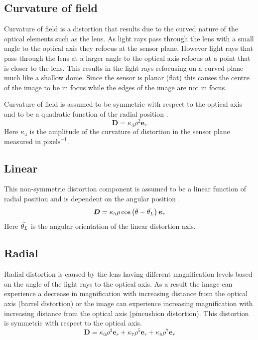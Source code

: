 \subsection{Curvature of field}
Curvature of field is a distortion that results due to the curved nature of the optical elements such as the lens. As light rays pass through the lens with a small angle to the optical axis they refocus at the sensor plane. However light rays that pass through the lens at a larger angle to the optical axis refocus at a point that is closer to the lens. This results in the light rays refocusing on a curved plane much like a shallow dome. Since the sensor is planar (flat) this causes the centre of the image to be in focus while the edges of the image are not in focus.

Curvature of field is assumed to be symmetric with respect to the optical axis and to be a quadratic function of the radial position \cite{sutton2009image}.
\begin{equation}
	\bm{D}=\kappa_4 \rho^2 \bm{e}_r
\end{equation}
Here $\kappa_4$ is the amplitude of the curvature of distortion in the sensor plane measured in $\text{pixels}^{-1}$.

\subsection{Linear}
This non-symmetric distortion component is assumed to be a linear function of radial position and is dependent on the angular position \cite{sutton2009image}.
\begin{equation}
	\bm{D} = \kappa_5 \rho \cos \left( \bar{\theta} - \bar{\theta_L} \right) \bm{e}_r
\end{equation}
Here $\bar{\theta_L}$ is the angular orientation of the linear distortion axis.

\subsection{Radial}
Radial distortion is caused by the lens having different magnification levels based on the angle of the light rays to the optical axis. As a result the image can experience a decrease in magnification with increasing distance from the optical axis (barrel distortion) or the image can experience increasing magnification with increasing distance from the optical axis (pincushion distortion). This distortion is symmetric with respect to the optical axis.
\begin{equation}
	\bm{D} = \kappa_6 \rho ^3 \bm{e}_r + \kappa_7 \rho^5 \bm{e}_r + \kappa_8 \rho^7 \bm{e}_r
\end{equation}
